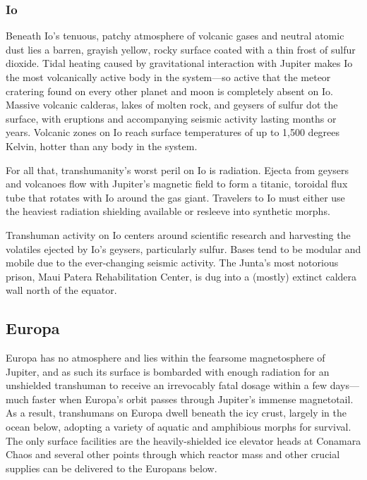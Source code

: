 \subsubsection{Io}

Beneath Io's tenuous, patchy atmosphere of volcanic 
gases and neutral atomic dust lies a barren, grayish 
yellow, rocky surface coated with a thin frost of sulfur 
dioxide. Tidal heating caused by gravitational interaction
with Jupiter makes Io the most volcanically
active body in the system—so active that the meteor 
cratering found on every other planet and moon is 
completely absent on Io. Massive volcanic calderas, 
lakes of molten rock, and geysers of sulfur dot the 
surface, with eruptions and accompanying seismic 
activity lasting months or years. Volcanic zones on 
Io reach surface temperatures of up to 1,500 degrees 
Kelvin, hotter than any body in the system.

For all that, transhumanity's worst peril on Io is 
radiation. Ejecta from geysers and volcanoes flow 
with Jupiter's magnetic field to form a titanic, toroidal 
flux tube that rotates with Io around the gas giant. 
Travelers to Io must either use the heaviest radiation 
shielding available or resleeve into synthetic morphs.

Transhuman activity on Io centers around scientific 
research and harvesting the volatiles ejected by Io's 
geysers, particularly sulfur. Bases tend to be modular 
and mobile due to the ever-changing seismic activity. 
The Junta's most notorious prison, Maui Patera Rehabilitation
Center, is dug into a (mostly) extinct caldera
wall north of the equator.

\subsection{Europa}

Europa has no atmosphere and lies within the fearsome
magnetosphere of Jupiter, and as such its surface
is bombarded with enough radiation for an unshielded 
transhuman to receive an irrevocably fatal dosage 
within a few days—much faster when Europa's orbit 
passes through Jupiter's immense magnetotail. As a 
result, transhumans on Europa dwell beneath the icy 
crust, largely in the ocean below, adopting a variety of 
aquatic and amphibious morphs for survival. The only 
surface facilities are the heavily-shielded ice elevator 
heads at Conamara Chaos and several other points 
through which reactor mass and other crucial supplies 
can be delivered to the Europans below.

